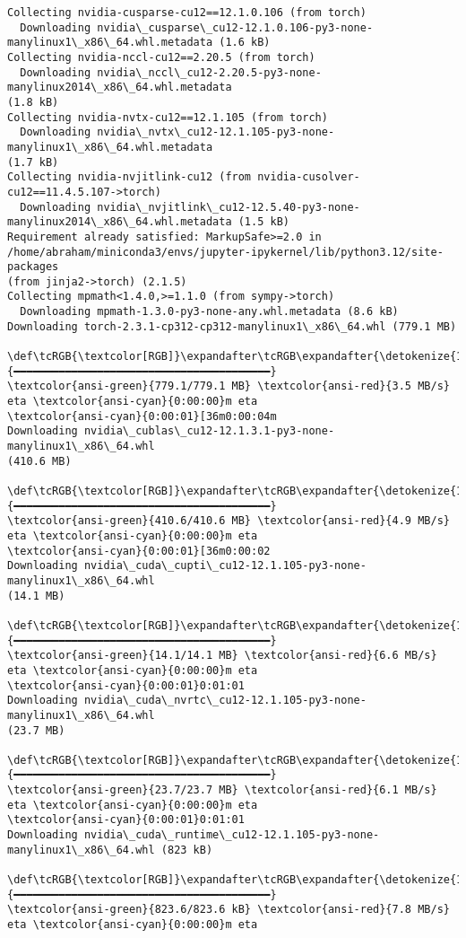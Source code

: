 \documentclass[11pt]{article}
\begin{document}
\begin{Verbatim}[commandchars=\\\{\}]
Collecting nvidia-cusparse-cu12==12.1.0.106 (from torch)
  Downloading nvidia\_cusparse\_cu12-12.1.0.106-py3-none-
manylinux1\_x86\_64.whl.metadata (1.6 kB)
Collecting nvidia-nccl-cu12==2.20.5 (from torch)
  Downloading nvidia\_nccl\_cu12-2.20.5-py3-none-manylinux2014\_x86\_64.whl.metadata
(1.8 kB)
Collecting nvidia-nvtx-cu12==12.1.105 (from torch)
  Downloading nvidia\_nvtx\_cu12-12.1.105-py3-none-manylinux1\_x86\_64.whl.metadata
(1.7 kB)
Collecting nvidia-nvjitlink-cu12 (from nvidia-cusolver-cu12==11.4.5.107->torch)
  Downloading nvidia\_nvjitlink\_cu12-12.5.40-py3-none-
manylinux2014\_x86\_64.whl.metadata (1.5 kB)
Requirement already satisfied: MarkupSafe>=2.0 in
/home/abraham/miniconda3/envs/jupyter-ipykernel/lib/python3.12/site-packages
(from jinja2->torch) (2.1.5)
Collecting mpmath<1.4.0,>=1.1.0 (from sympy->torch)
  Downloading mpmath-1.3.0-py3-none-any.whl.metadata (8.6 kB)
Downloading torch-2.3.1-cp312-cp312-manylinux1\_x86\_64.whl (779.1 MB)
   \def\tcRGB{\textcolor[RGB]}\expandafter\tcRGB\expandafter{\detokenize{114,156,31}}{━━━━━━━━━━━━━━━━━━━━━━━━━━━━━━━━━━━━━━━━}
\textcolor{ansi-green}{779.1/779.1 MB} \textcolor{ansi-red}{3.5 MB/s} eta \textcolor{ansi-cyan}{0:00:00}m eta
\textcolor{ansi-cyan}{0:00:01}[36m0:00:04m
Downloading nvidia\_cublas\_cu12-12.1.3.1-py3-none-manylinux1\_x86\_64.whl
(410.6 MB)
   \def\tcRGB{\textcolor[RGB]}\expandafter\tcRGB\expandafter{\detokenize{114,156,31}}{━━━━━━━━━━━━━━━━━━━━━━━━━━━━━━━━━━━━━━━━}
\textcolor{ansi-green}{410.6/410.6 MB} \textcolor{ansi-red}{4.9 MB/s} eta \textcolor{ansi-cyan}{0:00:00}m eta
\textcolor{ansi-cyan}{0:00:01}[36m0:00:02
Downloading nvidia\_cuda\_cupti\_cu12-12.1.105-py3-none-manylinux1\_x86\_64.whl
(14.1 MB)
   \def\tcRGB{\textcolor[RGB]}\expandafter\tcRGB\expandafter{\detokenize{114,156,31}}{━━━━━━━━━━━━━━━━━━━━━━━━━━━━━━━━━━━━━━━━}
\textcolor{ansi-green}{14.1/14.1 MB} \textcolor{ansi-red}{6.6 MB/s} eta \textcolor{ansi-cyan}{0:00:00}m eta
\textcolor{ansi-cyan}{0:00:01}0:01:01
Downloading nvidia\_cuda\_nvrtc\_cu12-12.1.105-py3-none-manylinux1\_x86\_64.whl
(23.7 MB)
   \def\tcRGB{\textcolor[RGB]}\expandafter\tcRGB\expandafter{\detokenize{114,156,31}}{━━━━━━━━━━━━━━━━━━━━━━━━━━━━━━━━━━━━━━━━}
\textcolor{ansi-green}{23.7/23.7 MB} \textcolor{ansi-red}{6.1 MB/s} eta \textcolor{ansi-cyan}{0:00:00}m eta
\textcolor{ansi-cyan}{0:00:01}0:01:01
Downloading nvidia\_cuda\_runtime\_cu12-12.1.105-py3-none-
manylinux1\_x86\_64.whl (823 kB)
   \def\tcRGB{\textcolor[RGB]}\expandafter\tcRGB\expandafter{\detokenize{114,156,31}}{━━━━━━━━━━━━━━━━━━━━━━━━━━━━━━━━━━━━━━━━}
\textcolor{ansi-green}{823.6/823.6 kB} \textcolor{ansi-red}{7.8 MB/s} eta \textcolor{ansi-cyan}{0:00:00}m eta

\end{Verbatim}
\end{document}
